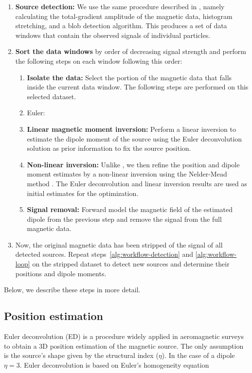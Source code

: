 \begin{enumerate}
    \item \textbf{Source detection:} We use the same procedure described in \citet{Souza-Junior2024}, namely calculating the total-gradient amplitude of the magnetic data, histogram stretching, and a blob detection algorithm. This produces a set of data windows that contain the observed signals of individual particles.
    \label{alg:workflow-detection}
    \item \textbf{Sort the data windows} by order of decreasing signal strength and perform the following steps on each window following this order:
    \label{alg:workflow-loop}
    \begin{enumerate}
        \item \textbf{Isolate the data:} Select the portion of the magnetic data that falls inside the current data window. The following steps are performed on this selected dataset.
        \item {Euler:}
        \item \textbf{Linear magnetic moment inversion:} Perform a linear inversion to estimate the dipole moment of the source using the Euler deconvolution solution as prior information to fix the source position.
        \item \textbf{Non-linear inversion:} Unlike \citet{Souza-Junior2024}, we then refine the position and dipole moment estimates by a non-linear inversion using the Nelder-Mead method \citep{Nelder-Mead1965,Gao2010}. The Euler deconvolution and linear inversion results are used as initial estimates for the optimization.
        \item \textbf{Signal removal:} Forward model the magnetic field of the estimated dipole from the previous step and remove the signal from the full magnetic data.
    \end{enumerate}
    \item Now, the original magnetic data has been stripped of the signal of all detected sources. Repeat steps~\ref{alg:workflow-detection} and \ref{alg:workflow-loop} on the stripped dataset to detect new sources and determine their positions and dipole moments.
\end{enumerate}

\noindent
Below, we describe these steps in more detail.

\subsection{Position estimation}
    Euler deconvolution (ED) \citep{Reid1990} is a procedure widely applied in aeromagnetic surveys \citep{Barbosa2011, Melo2013} to obtain a 3D position estimation of the magnetic source. The only assumption is the source's shape given by the structural index ($\eta$).
    In the case of a dipole $\eta = 3$. Euler deconvolution is based on Euler's homogeneity equation

